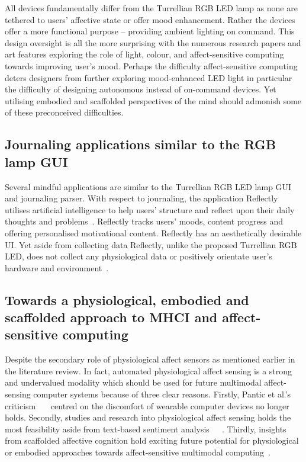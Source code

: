 \documentclass{sigchi}
\begin{document}
All devices fundamentally differ from the Turrellian RGB LED lamp as none are tethered to users’ affective state or offer mood enhancement. Rather the devices offer a more functional purpose – providing ambient lighting on command. This design oversight is all the more surprising with the numerous research papers and art features exploring the role of light, colour, and affect-sensitive computing towards improving user’s mood. Perhaps the difficulty affect-sensitive computing deters designers from further exploring mood-enhanced LED light in particular the difficulty of designing autonomous instead of on-command devices. Yet utilising embodied and scaffolded perspectives of the mind should admonish some of these preconceived difficulties. 

\subsection{Journaling applications similar to the RGB lamp GUI}

Several mindful applications are similar to the Turrellian RGB LED lamp GUI and journaling parser. With respect to journaling, the application Reflectly utilises artificial intelligence to help users’ structure and reflect upon their daily thoughts and problems~\cite{Reflectly01}. Reflectly tracks users’ moods, content progress and offering personalised motivational content. Reflectly has an aesthetically desirable UI. Yet aside from collecting data Reflectly, unlike the proposed Turrellian RGB LED, does not collect any physiological data or positively orientate user’s hardware and environment~\cite{Reflectly01}.

\subsection{Towards a physiological, embodied and scaffolded approach to MHCI and affect-sensitive computing}

Despite the secondary role of physiological affect sensors as mentioned earlier in the literature review. In fact, automated physiological affect sensing is a strong and undervalued modality which should be used for future multimodal affect-sensing computer systems because of three clear reasons. Firstly, Pantic et al.’s criticism~\cite{pantic2003toward}~\cite{pantic2008human}~\cite{6634207} centred on the discomfort of wearable computer devices no longer holds. Secondly, studies and research into physiological affect sensing holds the most feasibility aside from text-based sentiment analysis~\cite{goshvarpour2017fusion}~\cite{goshvarpour2017indices}~\cite{goshvarpour2017discrimination}. Thirdly, insights from scaffolded affective cognition hold exciting future potential for physiological or embodied approaches towards affect-sensitive multimodal computing~\cite{colombetti2015scaffoldings}. 
\end{document}
